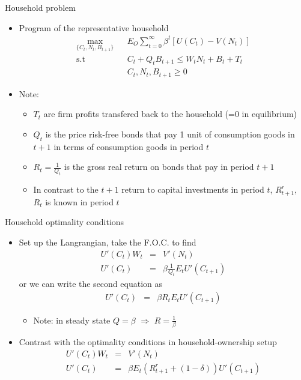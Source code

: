 \documentclass[9pt,xcolor={dvipsnames}]{beamer}
\newcommand{\bit}{\begin{itemize}}
\newcommand{\eit}{\end{itemize}}
\begin{document}
\begin{frame}{Household problem}

\bit
\setlength\itemsep{1.5em} 

\item Program of the representative household 
\begin{eqnarray}
\max_{\{C_t, N_t, B_{t+1}\}} && E_O \sum_{t=0}^{\infty} \beta^t \left[U(C_t)- V(N_t) \right]\nonumber \\
\text{s.t} && C_t + Q_t B_{t+1} \leq W_t N_t + B_t + T_t \nonumber \\
&& C_t, N_t, B_{t+1} \geq 0 \nonumber
\end{eqnarray}

\item Note:
\bit
\setlength\itemsep{0.5em}
\item $T_t$ are firm profits transfered back to the household (=0 in equilibrium)

\item $Q_t$ is the price risk-free bonds that pay 1 unit of consumption goods in $t+1$ in terms of consumption goods in period $t$

\item $R_{t}=\frac{1}{Q_t}$ is the gross real return on bonds that pay in period $t+1$

\item In contrast to the $t+1$ return to capital investments in period $t$, $R^{r}_{t+1}$, $R_{t}$ is known in period $t$
\eit

\eit

\end{frame}

\begin{frame}{Household optimality conditions}

\bit
\setlength\itemsep{1.5em} 
\item Set up the Langrangian, take the F.O.C. to find
\begin{eqnarray}
U'(C_t)W_t &=& V'(N_t) \nonumber \\
U'(C_t) &=& \beta\frac{1}{Q_t} E_t U'(C_{t+1}) \nonumber 
\end{eqnarray}
or we can write the second equation as
\begin{eqnarray}
U'(C_t) &=& \beta R_{t} E_t U'(C_{t+1}) \nonumber 
\end{eqnarray}
\bit
 \item Note: in steady state $Q=\beta$ $\Rightarrow$ $R=\frac{1}{\beta}$
\eit

\item Contrast with the optimality conditions in household-ownership setup
\begin{eqnarray}
U'(C_t)W_t &=& V'(N_t) \nonumber \\
U'(C_t) &=& \beta E_t(R^{r}_{t+1}+(1-\delta)) U'(C_{t+1}) \nonumber 
\end{eqnarray}



\eit

\end{frame}
\end{document}
